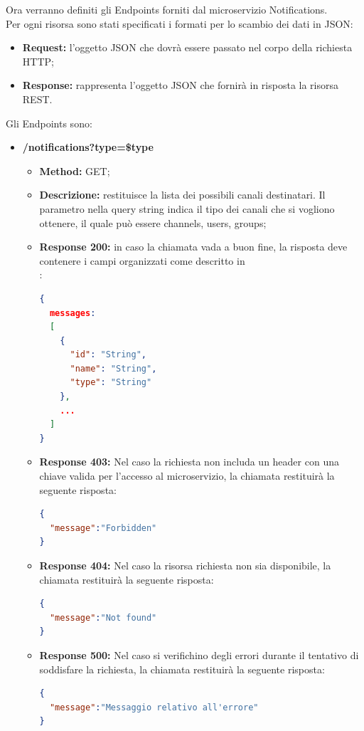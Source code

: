 Ora verranno definiti gli Endpoints forniti dal microservizio Notifications. \\
Per ogni risorsa sono stati specificati i formati per lo scambio dei dati in JSON:
\begin{itemize}
\item \textbf{Request:} l’oggetto JSON che dovrà essere passato nel corpo della richiesta HTTP;
\item \textbf{Response:} rappresenta l’oggetto JSON che fornirà in risposta la risorsa REST.
\end{itemize}
Gli Endpoints sono:
\begin{itemize}

\item \textbf{/notifications?type=\$type}\\
\begin{itemize}
\item \textbf{Method:} GET;
\item \textbf{Descrizione:} restituisce la lista dei possibili canali destinatari. Il parametro nella query string  indica il tipo dei canali che si vogliono ottenere, il quale può essere channels, users, groups;
\item \textbf{Response 200:} in caso la chiamata vada a buon fine, la risposta deve contenere i campi organizzati come descritto in \\:
\begin{lstlisting}[language=json,firstnumber=1]
{
  messages:
  [
    {
      "id": "String",
      "name": "String",
      "type": "String"
    },
    ...
  ]
}
\end{lstlisting}
\item \textbf{Response 403:} Nel caso la richiesta non includa un header  con una chiave valida per l'accesso al microservizio, la chiamata restituirà la seguente risposta:
\begin{lstlisting}[language=json,firstnumber=1]
{
  "message":"Forbidden"
}
\end{lstlisting}
\item \textbf{Response 404:} Nel caso la risorsa richiesta non sia disponibile, la chiamata restituirà la seguente risposta:
\begin{lstlisting}[language=json,firstnumber=1]
{
  "message":"Not found"
}
\end{lstlisting}
\item \textbf{Response 500:} Nel caso si verifichino degli errori durante il tentativo di soddisfare la richiesta, la chiamata restituirà la seguente risposta:
\begin{lstlisting}[language=json,firstnumber=1]
{
  "message":"Messaggio relativo all'errore"
}
\end{lstlisting}
\end{itemize}


\end{itemize}
